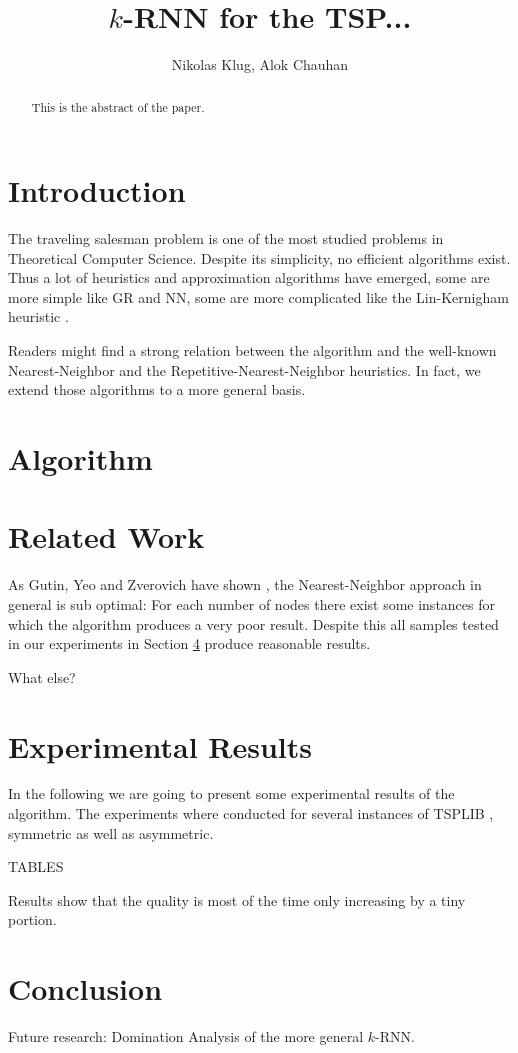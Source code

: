 \documentclass[11pt]{article}
\title{$k$-RNN for the TSP...}
\author{Nikolas Klug, Alok Chauhan}
\begin{document}
	\maketitle
	\begin{abstract}
		This is the abstract of the paper.
	\end{abstract}

	\section{Introduction}
	\label{sec:introduction}
	The traveling salesman problem is one of the most studied problems in Theoretical Computer Science. 
	Despite its simplicity, no efficient algorithms exist. 
	Thus a lot of heuristics and approximation algorithms have emerged, some are more simple like GR and NN, some are more complicated like the Lin-Kernigham heuristic \cite{LIN1973}.
	
	Readers might find a strong relation between the algorithm and the well-known Nearest-Neighbor and the Repetitive-Nearest-Neighbor heuristics. 
	In fact, we extend those algorithms to a more general basis.
	
	\section{Algorithm}
	\label{sec:algorithm}
	
	
	\section{Related Work}
	\label{sec:related}
	
	As Gutin, Yeo and Zverovich have shown \cite{GUTIN2002}, the Nearest-Neighbor approach in general is sub optimal: 
	For each number of nodes there exist some instances for which the algorithm produces a very poor result. 
	Despite this all samples tested in our experiments in Section \ref{sec:experimental} produce reasonable results.
	
	What else?
	\section{Experimental Results}
	\label{sec:experimental}
	
	In the following we are going to present some experimental results of the algorithm. The experiments where conducted for several instances of TSPLIB \cite{REINELT1995}, symmetric as well as asymmetric.
	
	TABLES
	
	
	
	
	
	Results show that the quality is most of the time only increasing by a tiny portion.

	
	\section{Conclusion}
	\label{sec:conclusion}
	
	Future research: Domination Analysis of the more general $k$-RNN.
	
	
	
	
\end{document}
